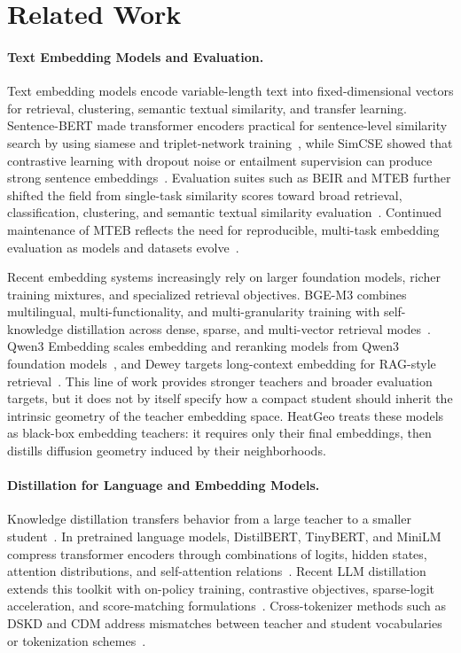 \section{Related Work}

\paragraph{Text Embedding Models and Evaluation.}
Text embedding models encode variable-length text into fixed-dimensional vectors for retrieval, clustering, semantic textual similarity, and transfer learning. Sentence-BERT made transformer encoders practical for sentence-level similarity search by using siamese and triplet-network training~\citep{reimers2019sentencebert}, while SimCSE showed that contrastive learning with dropout noise or entailment supervision can produce strong sentence embeddings~\citep{gao2021simcse}. Evaluation suites such as BEIR and MTEB further shifted the field from single-task similarity scores toward broad retrieval, classification, clustering, and semantic textual similarity evaluation~\citep{thakur2021beir,muennighoff2023mteb}. Continued maintenance of MTEB reflects the need for reproducible, multi-task embedding evaluation as models and datasets evolve~\citep{chung2025maintainingmteb}.

Recent embedding systems increasingly rely on larger foundation models, richer training mixtures, and specialized retrieval objectives. BGE-M3 combines multilingual, multi-functionality, and multi-granularity training with self-knowledge distillation across dense, sparse, and multi-vector retrieval modes~\citep{chen2024bgem3}. Qwen3 Embedding scales embedding and reranking models from Qwen3 foundation models~\citep{zhang2025qwen3embedding}, and Dewey targets long-context embedding for RAG-style retrieval~\citep{zhang2025dewey}. This line of work provides stronger teachers and broader evaluation targets, but it does not by itself specify how a compact student should inherit the intrinsic geometry of the teacher embedding space. HeatGeo treats these models as black-box embedding teachers: it requires only their final embeddings, then distills diffusion geometry induced by their neighborhoods.

\paragraph{Distillation for Language and Embedding Models.}
Knowledge distillation transfers behavior from a large teacher to a smaller student~\citep{hinton2015distilling}. In pretrained language models, DistilBERT, TinyBERT, and MiniLM compress transformer encoders through combinations of logits, hidden states, attention distributions, and self-attention relations~\citep{sanh2019distilbert,jiao2019tinybert,wang2020minilm}. Recent LLM distillation extends this toolkit with on-policy training, contrastive objectives, sparse-logit acceleration, and score-matching formulations~\citep{agarwal2024onpolicy,ko2025distillm2,anshumann2025sparse,kim2025csd,xu2024survey}. Cross-tokenizer methods such as DSKD and CDM address mismatches between teacher and student vocabularies or tokenization schemes~\citep{zhang2024dskd,chen2025cdm}.

